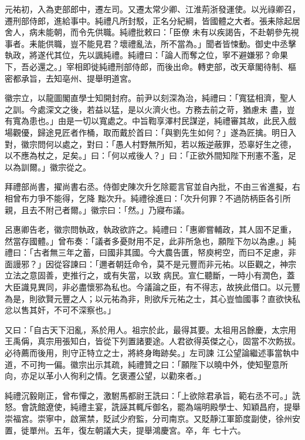 \begin{pinyinscope}
 元祐初，入為吏部郎中，遷左司。又遷太常少卿、江淮荊浙發運使。以光祿卿召，遷刑部侍郎，進給事中。純禮凡所封駁，正名分紀綱，皆國體之大者。張耒除起居舍人，病未能朝，而令先供職。純禮批敕曰：「臣僚
 未有以疾謁告，不赴朝參先視事者。耒能供職，豈不能見君？壞禮亂法，所不當為。」聞者皆悚動。御史中丞擊執政，將遂代其位，先以諷純禮。純禮曰：「論人而奪之位，寧不避嫌邪？命果下，吾必還之。」宰相即徙純禮刑部侍郎，而後出命。轉吏部，改天章閣待制、樞密都承旨，去知亳州、提舉明道宮。



 徽宗立，以龍圖閣直學士知開封府。前尹以刻深為治，純禮曰：「寬猛相濟，聖人之訓。今處深文之後，若益以猛，是以火濟火也。方務去前之苛，猶慮未
 盡，豈有寬為患也。」由是一切以寬處之。中旨鞫享澤村民謀逆，純禮審其故，此民入戲場觀優，歸途見匠者作桶，取而戴於首曰：「與劉先生如何？」遂為匠擒。明日入對，徽宗問何以處之，對曰：「愚人村野無所知，若以叛逆蔽罪，恐辜好生之德，以不應為杖之，足矣。」曰：「何以戒後人？」曰：「正欲外間知陛下刑憲不濫，足以為訓爾。」徽宗從之。



 拜禮部尚書，擢尚書右丞。侍御史陳次升乞除罷言官並自內批，不由三省進擬，右相曾布力爭不能得，乞降
 黜次升。純禮徐進曰：「次升何罪？不過防柄臣各引所親，且去不附己者爾。」徽宗曰：「然。」乃寢布議。



 呂惠卿告老，徽宗問執政，執政欲許之。純禮曰：「惠卿嘗輔政，其人固不足重，然當存國體。」曾布奏：「議者多憂財用不足，此非所急也，願陛下勿以為慮。」純禮曰：「古者無三年之蓄，曰國非其國。今大農告匱，帑庾枵空，而曰不足慮，非面謾邪？」因從容諫曰：「邇者朝廷命令，莫不是元豐而非元祐。以臣觀之，神宗立法之意固善，吏推行之，或有失當，以致
 病民。宣仁聽斷，一時小有潤色，蓋大臣識見異同，非必盡懷邪為私也。今議論之臣，有不得志，故挾此借口。以元豐為是，則欲賢元豐之人；以元祐為非，則欲斥元祐之士，其心豈恤國事？直欲快私忿以售其奸，不可不深察也。」



 又曰：「自古天下汨亂，系於用人。祖宗於此，最得其要。太祖用呂餘慶，太宗用王禹偁，真宗用張知白，皆從下列置諸要途。人君欲得英傑之心，固當不次飭拔。必待薦而後用，則守正特立之士，將終身晦跡矣。」左司諫
 江公望論繼述事當執中道，不可拘一偏。徽宗出示其疏，純禮贊之曰：「願陛下以曉中外，使知聖意所向，亦足以革小人徇利之情。乞褒遷公望，以勸來者。」



 純禮沉毅剛正，曾布憚之，激駙馬都尉王詵曰：「上欲除君承旨，範右丞不可。」詵怒。會詵館遼使，純禮主宴，詵誣其輒斥御名，罷為端明殿學士、知穎昌府，提舉崇福宮。崇寧中，啟黨禁，貶試少府監，分司南京。又貶靜江軍節度副使，徐州安置，徙單州。五年，復左朝議大夫，提舉鴻慶宮。卒，年
 七十六。




\end{pinyinscope}
